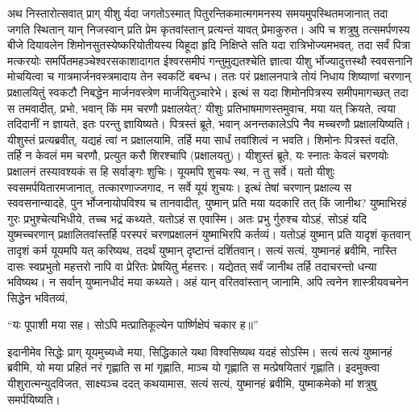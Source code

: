 \adhyAya
{}
\vakya अथ निस्तारोत्सवात् प्राग् यीशु र्यदा जगतोऽस्मात् पितुरन्तिकमात्मगमनस्य समयमुपस्थितमजानात् तदा जगति स्थितान् यान् निजस्वान् प्रति प्रेम कृतवांस्तान् प्रत्यन्तं यावत् प्रेमाकुरुत।
\vakya अपि च शत्रुषु तत्समर्पणस्य बीजे दियावलेन शिमोनसुतस्येष्करियोतीयस्य यिहूदा हृदि निक्षिप्ते सति यदा रात्रिभोज्यमभवत्,
\vakya तदा सर्वं पित्रा मत्करयोः समर्पितमहञ्चेश्वरसकाशादागत ईश्वरसमीपं गन्तुमुद्यतश्चेति ज्ञात्वा
\vakya यीशु र्भोज्यादुत्तस्थौ स्ववसनानि मोचयित्वा च गात्रमार्जनवस्त्रमादाय तेन स्वकटिं बबन्ध।
\vakya ततः परं प्रक्षालनपात्रे तोयं निधाय शिष्याणां चरणान् प्रक्षालयितुं स्वकटौ निबद्धेन मार्जनवस्त्रेण मार्जयितुञ्चारेभे।
\vakya इत्थं स यदा शिमोनपित्रस्य समीपमागच्छत् तदा स तमवादीत्, प्रभो, भवान् किं मम चरणौ प्रक्षालयेत्?
\vakya यीशुः प्रतिभाषमाणस्तमुवाच, मया यत् क्रियते, त्वया तदिदानीं न ज्ञायते, इतः परन्तु ज्ञायिष्यते।
\vakya पित्रस्तं ब्रूते, भवान् अनन्तकालेऽपि नैव मच्चरणौ प्रक्षालयिष्यति। यीशुस्तं प्रत्यब्रवीत्, यद्यहं त्वां न प्रक्षालयामि, तर्हि मया सार्धं तवांशित्वं न भवति।
\vakya शिमोनः पित्रस्तं वदति, तर्हि न केवलं मम चरणौ, प्रत्युत करौ शिरश्चापि (प्रक्षालयतु)।
\vakya यीशुस्तं ब्रूते, यः स्नातः केवलं चरणयोः प्रक्षालनं तस्यावश्यकं स हि सर्वाङ्गः शुचिः। यूयमपि शुचयः स्थ, न तु सर्वे।
\vakya यतो यीशुः स्वसमर्पयितारमजानात्, तत्कारणाज्जगाद, न सर्वे यूयं शुचयः।
\vakya इत्थं तेषां चरणान् प्रक्षाल्य स स्ववसनान्यादहे, पुन र्भोजनायोपविश्य च तानवादीत्, युष्मान् प्रति मया यदकारि तत् किं जानीथ?
\vakya युष्माभिरहं गुरः प्रभुश्चेत्यभिधीये, तच्च भद्रं कथ्यते, यतोऽहं स एवास्मि।
\vakya अतः प्रभु र्गुरुश्च योऽहं, सोऽहं यदि युष्मच्चरणान् प्रक्षालितवांस्तर्हि परस्परं चरणप्रक्षालनं युष्माभिरपि कर्तव्यं।
\vakya यतोऽहं युष्मान् प्रति यादृशं कृतवान् तादृशं कर्म यूयमपि यत् करिष्यथ, तदर्थं युष्मान् दृष्टान्तं दर्शितवान्।
\vakya सत्यं सत्यं, युष्मानहं ब्रवीमि, नास्ति दासः स्वप्रभुतो महत्तरो नापि वा प्रेरितः प्रेषयितु र्महत्तरः।
\vakya यद्येतत् सर्वं जानीथ तर्हि तदाचरन्तो धन्या भविष्यथ।
\vakya न सर्वान् युष्मानधीदं मया कथ्यते। अहं यान् वरितवांस्तान् जानामि, अपि त्वनेन शास्त्रीयवचनेन सिद्धेन भवितव्यं,
\begin{poem}
\startwithline “\textunderscore\textunderscore\textunderscore यः पूपाशी मया सह।
\pline सोऽपि मत्प्रातिकूल्येन पार्ष्णिक्षेपं चकार ह॥”
\end{poem}
\vakya इदानीमेव सिद्धेः प्राग् यूयमुच्यध्वे मया, सिद्धिकाले यथा विश्वसिष्यथ यदहं सोऽस्मि।
\vakya सत्यं सत्यं युष्मानहं ब्रवीमि, यो मया प्रहितं नरं गृह्णाति स मां गृह्णाति, माञ्च यो गृह्णाति स मत्प्रेषयितारं गृह्णाति।
\vakya इदमुक्त्वा यीशुरात्मन्युदविजत, साक्ष्यञ्च ददत् कथयामास, सत्यं सत्यं, युष्मानहं ब्रवीमि, युष्माकमेको मां शत्रुषु समर्पयिष्यति।
